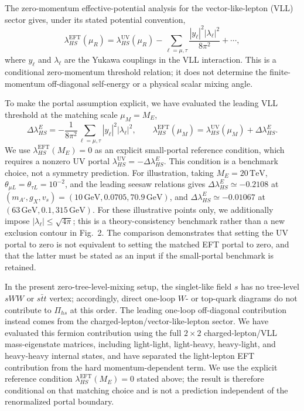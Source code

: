 \documentclass[12pt,a4paper]{article}
\begin{document}
The zero-momentum effective-potential analysis for the vector-like-lepton (VLL) sector gives, under its stated potential convention,
\[
\lambda_{HS}^{\mathrm{EFT}}(\mu_R)
=\lambda_{HS}^{\mathrm{UV}}(\mu_R)
-\sum_{\ell=\mu,\tau}
\frac{|y_\ell|^2|\lambda_\ell|^2}{8\pi^2}
+\cdots,
\]
where \(y_\ell\) and \(\lambda_\ell\) are the Yukawa couplings in the VLL interaction. This is a conditional zero-momentum threshold relation; it does not determine the finite-momentum off-diagonal self-energy or a physical scalar mixing angle.

To make the portal assumption explicit, we have evaluated the leading VLL threshold at the matching scale \(\mu_M=M_E\),
\[
\Delta\lambda_{HS}^{E}
=-\frac{1}{8\pi^2}\sum_{\ell=\mu,\tau}|y_\ell|^2|\lambda_\ell|^2,
\qquad
\lambda_{HS}^{\mathrm{EFT}}(\mu_M)
=\lambda_{HS}^{\mathrm{UV}}(\mu_M)+\Delta\lambda_{HS}^{E}.
\]
We use \(\lambda_{HS}^{\mathrm{EFT}}(M_E)=0\) as an explicit small-portal reference condition, which requires a nonzero UV portal \(\lambda_{HS}^{\mathrm{UV}}=-\Delta\lambda_{HS}^{E}\). This condition is a benchmark choice, not a symmetry prediction. For illustration, taking \(M_E=20\,\mathrm{TeV}\), \(\theta_{\mu L}=\theta_{\tau L}=10^{-2}\), and the leading seesaw relations gives \(\Delta\lambda_{HS}^{E}\simeq-0.2108\) at \((m_{A'},g_X,v_s)=(10\,\mathrm{GeV},0.0705,70.9\,\mathrm{GeV})\), and \(\Delta\lambda_{HS}^{E}\simeq-0.01067\) at \((63\,\mathrm{GeV},0.1,315\,\mathrm{GeV})\). For these illustrative points only, we additionally impose \(|\lambda_\ell|\leq\sqrt{4\pi}\); this is a theory-consistency benchmark rather than a new exclusion contour in Fig.~2. The comparison demonstrates that setting the UV portal to zero is not equivalent to setting the matched EFT portal to zero, and that the latter must be stated as an input if the small-portal benchmark is retained.

In the present zero-tree-level-mixing setup, the singlet-like field \(s\) has no tree-level \(sWW\) or \(s\bar t t\) vertex; accordingly, direct one-loop \(W\)- or top-quark diagrams do not contribute to \(\Pi_{hs}\) at this order. The leading one-loop off-diagonal contribution instead comes from the charged-lepton/vector-like-lepton sector. We have evaluated this fermion contribution using the full \(2\times2\) charged-lepton/VLL mass-eigenstate matrices, including light-light, light-heavy, heavy-light, and heavy-heavy internal states, and have separated the light-lepton EFT contribution from the hard momentum-dependent term. We use the explicit reference condition \(\lambda_{HS}^{\mathrm{EFT}}(M_E)=0\) stated above; the result is therefore conditional on that matching choice and is not a prediction independent of the renormalized portal boundary.
\end{document}
